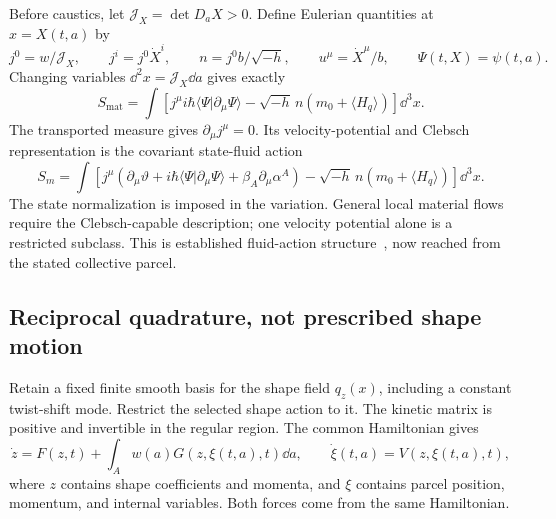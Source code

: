 \documentclass[11pt]{article}
\begin{document}
Before caustics, let $\mathcal J_X=\det D_aX>0$. Define Eulerian quantities at $x=X(t,a)$ by
\[
j^0=w/\mathcal J_X,\qquad j^i=j^0\dot X^i,\qquad
n=j^0b/\sqrt{-h},\qquad u^\mu=\dot X^\mu/b,\qquad
\Psi(t,X)=\psi(t,a).
\]
Changing variables $\dd^2x=\mathcal J_X\dd a$ gives exactly
\[
S_{\mathrm{mat}}=\int\left[
j^\mu i\hbar\langle\Psi|\partial_\mu\Psi\rangle
-\sqrt{-h}\,n(m_0+\langle H_q\rangle)\right]\dd^3x.
\]
The transported measure gives $\partial_\mu j^\mu=0$. Its velocity-potential and Clebsch representation is the covariant state-fluid action
\begin{equation}\label{eq:Brown}
\boxed{S_m=\int\left[
j^\mu\left(\partial_\mu\vartheta+i\hbar\langle\Psi|\partial_\mu\Psi\rangle
+\beta_A\partial_\mu\alpha^A\right)
-\sqrt{-h}\,n(m_0+\langle H_q\rangle)\right]\dd^3x.}
\end{equation}
The state normalization is imposed in the variation. General local material flows require the Clebsch-capable description; one velocity potential alone is a restricted subclass. This is established fluid-action structure~\cite{Brown}, now reached from the stated collective parcel.

\subsection{Reciprocal quadrature, not prescribed shape motion}
Retain a fixed finite smooth basis for the shape field $q_z(x)$, including a constant twist-shift mode. Restrict the selected shape action to it. The kinetic matrix is positive and invertible in the regular region. The common Hamiltonian gives
\begin{equation}\label{eq:feedback}
\dot z=F(z,t)+\int_Aw(a)G(z,\xi(t,a),t)\dd a,\qquad
\dot\xi(t,a)=V(z,\xi(t,a),t),
\end{equation}
where $z$ contains shape coefficients and momenta, and $\xi$ contains parcel position, momentum, and internal variables. Both forces come from the same Hamiltonian.
\end{document}
